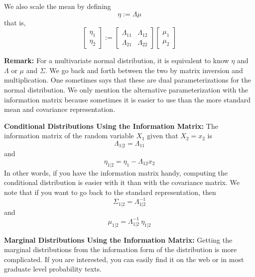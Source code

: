 \documentclass[letterpaper]{article}
\begin{document}
We also scale the mean by defining
$$\eta := \Lambda \mu$$
that is,
$$\begin{bmatrix} \eta_1 \\ \eta_2 \end{bmatrix} :=  \left[ \begin{array}{cc} \Lambda_{11} & \Lambda_{12} \\ \Lambda_{21} & \Lambda_{22} \end{array}  \right] \begin{bmatrix} \mu_1 \\ \mu_2 \end{bmatrix} $$


 \noindent \textbf{Remark:} For a multivariate normal distribution, it is equivalent to know $\eta$ and $\Lambda$ or $\mu$ and $\Sigma$. We go back and forth between the two by matrix inversion and multiplication.  One sometimes says that these are dual parameterizations for the normal distribution. We only mention the alternative parameterization with the information matrix because sometimes it is easier to use than the more standard mean and covariance representation.

 \newpage

 \noindent \textbf{Conditional Distributions Using the Information Matrix:} The information matrix of the random variable $X_1$ given that $X_2=x_2$ is
 $$\Lambda_{1|2} = \Lambda_{11}$$
 and
 $$\eta_{1|2} = \eta_1 - \Lambda_{12}x_2$$
 In other words, if you have the information matrix handy, computing the conditional distribution is easier with it than with the covariance matrix.  We note that if you want to go back to the standard representation, then
 $$ \Sigma_{1|2} = \Lambda_{1|2} ^{-1}$$
 and
  $$\mu_{1|2} =  \Lambda_{1|2} ^{-1} ~ \eta_{1|2} $$

  \noindent \textbf{Marginal Distributions Using the Information Matrix:} Getting the marginal distributions from the information form of the distribution is more complicated.  If you are interested, you can easily find it on the web or in most graduate level probability texts.
\end{document}
